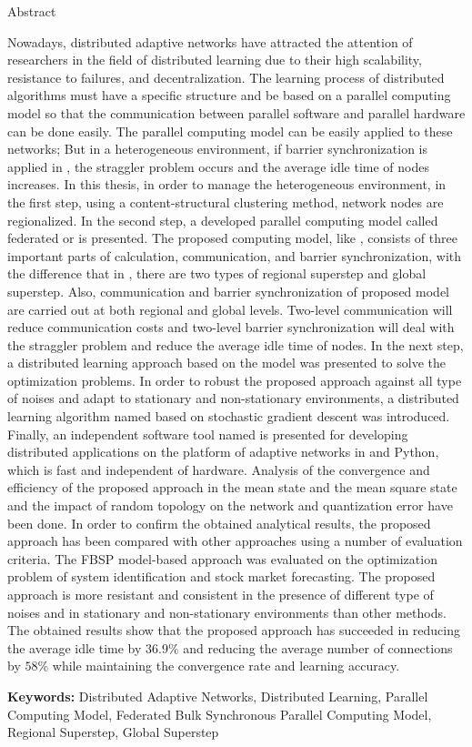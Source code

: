 \def\title{\large{Abstract}}
\def\keyword{\textbf{Keywords: }}
\def\abstracten{ 
Nowadays, distributed adaptive networks have attracted the attention of researchers in the field of distributed learning due to their high scalability, resistance to failures, and decentralization. The learning process of distributed algorithms must have a specific structure and be based on a parallel computing model so that the communication between parallel software and parallel hardware can be done easily. The parallel computing model \lr{BSP} can be easily applied to these networks; But in a heterogeneous environment, if barrier synchronization is applied in \lr{BSP}, the straggler problem occurs and the average idle time of nodes increases. In this thesis, in order to manage the heterogeneous environment, in the first step, using a content-structural clustering method, network nodes are regionalized. In the second step, a developed parallel computing model called federated \lr{BSP} or \lr{FBSP} is presented. The proposed computing model, like \lr{BSP}, consists of three important parts of calculation, communication, and barrier synchronization, with the difference that in \lr{FBSP}, there are two types of regional superstep and global superstep. Also, communication and barrier synchronization of proposed model are carried out at both regional and global levels. Two-level communication will reduce communication costs and two-level barrier synchronization will deal with the straggler problem and reduce the average idle time of nodes. In the next step, a distributed learning approach based on the \lr{FBSP} model was presented to solve the optimization problems. In order to robust the proposed approach against all type of noises and adapt to stationary and non-stationary environments, a distributed learning algorithm named \lr{RDSGD} based on stochastic gradient descent was introduced. Finally, an independent software tool named \lr{FBSPonMPI} is presented for developing distributed applications on the platform of adaptive networks in \lr{C} and Python, which is fast and independent of hardware. Analysis of the convergence and efficiency of the proposed approach in the mean state and the mean square state and the impact of random topology on the network and quantization error have been done. In order to confirm the obtained analytical results, the proposed approach has been compared with other approaches using a number of evaluation criteria. The FBSP model-based approach was evaluated on the optimization problem of system identification and stock market forecasting. The proposed approach is more resistant and consistent in the presence of different type of noises and in stationary and non-stationary environments than other methods. The obtained results show that the proposed approach has succeeded in reducing the average idle time by $36.9\%$ and reducing the average number of connections by $58\%$ while maintaining the convergence rate and learning accuracy.
}

\def\keyworden{Distributed Adaptive Networks, Distributed Learning, Parallel Computing Model, Federated Bulk Synchronous Parallel Computing Model, Regional Superstep, Global Superstep}



\begin{center}
\title
\end{center}
\abstracten

\keyword
\keyworden
